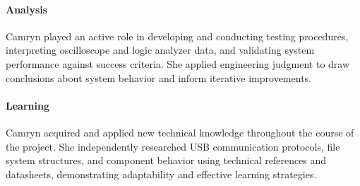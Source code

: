 \documentclass[../../main.tex]{subfiles}
\begin{document}
\paragraph{Analysis}
Camryn played an active role in developing and conducting testing procedures, interpreting oscilloscope and logic analyzer data, and validating system performance against success criteria. She applied engineering judgment to draw conclusions about system behavior and inform iterative improvements.

\paragraph{Learning}
Camryn acquired and applied new technical knowledge throughout the course of the project. She independently researched USB communication protocols, file system structures, and component behavior using technical references and datasheets, demonstrating adaptability and effective learning strategies.
\end{document}
